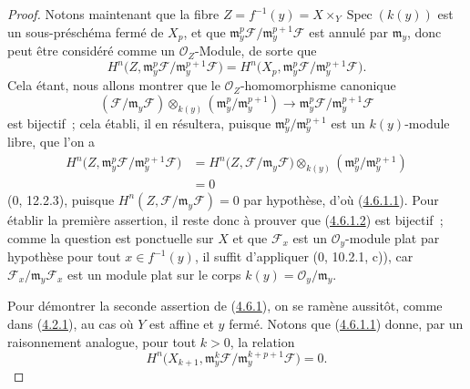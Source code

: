 \begin{proof}
Notons maintenant que la fibre
$Z=f^{-1}(y)=X\times_Y\operatorname{Spec}(k(y))$ est un sous-préschéma fermé
de $X_p$, et que
$\mathfrak m_y^p\mathcal F/\mathfrak m_y^{p+1}\mathcal F$ est annulé par
$\mathfrak m_y$, donc peut être considéré comme un $\mathcal O_Z$-Module, de
sorte que
\[
H^n\bigl(Z,\mathfrak m_y^p\mathcal F/
\mathfrak m_y^{p+1}\mathcal F\bigr)
=H^n\bigl(X_p,\mathfrak m_y^p\mathcal F/
\mathfrak m_y^{p+1}\mathcal F\bigr).
\]
Cela étant, nous allons montrer que le $\mathcal O_Z$-homomorphisme canonique
\[
\label{III.4.6.1.2-fr}
(\mathcal F/\mathfrak m_y\mathcal F)
\otimes_{k(y)}(\mathfrak m_y^p/\mathfrak m_y^{p+1})
\longrightarrow
\mathfrak m_y^p\mathcal F/\mathfrak m_y^{p+1}\mathcal F
\tag{4.6.1.2}
\]
est bijectif~; cela établi, il en résultera, puisque
$\mathfrak m_y^p/\mathfrak m_y^{p+1}$ est un $k(y)$-module libre, que l'on a
\[
\begin{split}
H^n\bigl(Z,\mathfrak m_y^p\mathcal F/
\mathfrak m_y^{p+1}\mathcal F\bigr)
&=H^n\bigl(Z,\mathcal F/\mathfrak m_y\mathcal F\bigr)
\otimes_{k(y)}(\mathfrak m_y^p/\mathfrak m_y^{p+1})\\
&=0
\end{split}
\]
(0, 12.2.3), puisque
$H^n(Z,\mathcal F/\mathfrak m_y\mathcal F)=0$ par hypothèse, d'où
(\hyperref[III.4.6.1.1-fr]{4.6.1.1}). Pour établir la première assertion, il
reste donc à prouver que (\hyperref[III.4.6.1.2-fr]{4.6.1.2}) est bijectif~;
comme la question est ponctuelle sur $X$ et que $\mathcal F_x$ est un
$\mathcal O_y$-module plat par hypothèse pour tout $x\in f^{-1}(y)$, il
suffit d'appliquer (0, 10.2.1, c)), car
$\mathcal F_x/\mathfrak m_y\mathcal F_x$ est un module plat sur le corps
$k(y)=\mathcal O_y/\mathfrak m_y$.

Pour démontrer la seconde assertion de (\hyperref[III.4.6.1-fr]{4.6.1}), on
se ramène aussitôt, comme dans (\hyperref[III.4.2.1-fr]{4.2.1}), au cas où
$Y$ est affine et $y$ fermé. Notons que
(\hyperref[III.4.6.1.1-fr]{4.6.1.1}) donne, par un raisonnement analogue,
pour tout $k>0$, la relation
\[
\label{III.4.6.1.3-fr}
H^n\bigl(X_{k+1},
\mathfrak m_y^k\mathcal F/
\mathfrak m_y^{k+p+1}\mathcal F\bigr)=0.
\tag{4.6.1.3}
\]



\end{proof}
